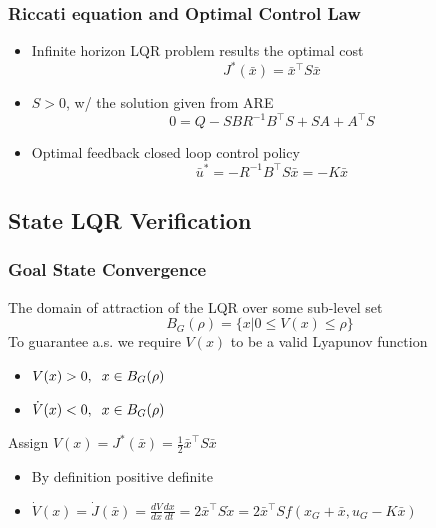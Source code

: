 \documentclass{beamer}
\begin{document}

\begin{frame}
\frametitle{Riccati equation and Optimal Control Law}
\begin{itemize}
\item Infinite horizon LQR problem results the optimal cost
\begin{equation*}
J^{\ast}(\bar{x})=\bar{x}^{\intercal}S\bar{x}
\end{equation*} 
\item $S > 0$, w/ the solution given from ARE
\begin{equation*}
0=Q-SBR^{-1}B^{\intercal}S+SA+A^{\intercal}S
\end{equation*}
\item Optimal feedback closed loop control policy 
\begin{equation*}
\bar{u}^{\ast}=-R^{-1}B^{\intercal}S\bar{x}=-K\bar{x}
\end{equation*}
\end{itemize}
\end{frame}


\subsection{State LQR Verification}

\begin{frame}
\frametitle{Goal State Convergence}
The domain of attraction of the LQR over some sub-level set
\begin{equation*}
B_G(\rho)=\{ x|0\leq V(x) \leq \rho \} 
\end{equation*} 
To guarantee a.s. we require $V(x)$ to be a valid Lyapunov function
\begin{itemize}
\item $V(x)>0, \hspace{.2cm} x\in B_G(\rho)$
\item $\dot{V}(x)<0, \hspace{.2cm} x\in B_G(\rho)$
\end{itemize}
\vspace{.4cm}
Assign $V(x)=J^{\ast}(\bar{x}) = \frac{1}{2}\bar{x}^{\intercal}S\bar{x}$
\begin{itemize}
\item By definition positive definite
\item $\dot{V}(x)=\dot{J}(\bar{x})=\frac{dV}{dx} \frac{dx}{dt} = 2\bar{x}^{\intercal}S\dot{x} = 2\bar{x}^{\intercal}Sf(x_G+\bar{x}, u_G-K\bar{x}) $
\end{itemize}
\end{frame}
\end{document}
